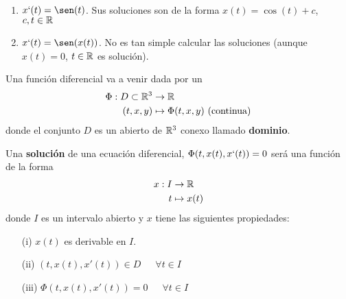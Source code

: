 \begin{ejemplo}\
    \begin{enumerate}[label=\alph*)]
        \item $x`(t)=\sen(t)$. Sus soluciones son de la forma $x(t)=\cos(t)+c$, $c,t\in \mathbb{R}$
        \item $x`(t)=\sen(x(t))$. No es tan simple calcular las soluciones (aunque $x(t)=0$, $t\in \mathbb{R}$ es solución).
    \end{enumerate}
\end{ejemplo}

\begin{definicion}
    Una función diferencial va a venir dada por un 
    \begin{align*}
        \Phi : D \subset \mathbb{R}^3 &\to \mathbb{R}\\
        (t,x,y) &\mapsto \Phi(t,x,y) \text{ (continua)}
    \end{align*}
    donde el conjunto $D$ es un abierto de $\mathbb{R}^3$ conexo llamado \textbf{dominio}.

    Una \textbf{solución} de una ecuación diferencial, $\Phi(t,x(t),x`(t))=0$ será una función de la forma 
    \begin{align*}
        x: I &\to \mathbb{R}\\
        t & \mapsto x(t)
    \end{align*}
    donde $I$ es un intervalo abierto y $x$ tiene las siguientes propiedades:
    \begin{enumerate}
        \item[(i)] $x(t)$ es derivable en $I$.
        \item[(ii)] $(t,x(t), x'(t))\in D$\ \ \ $\forall t \in I$
        \item[(iii)] $\Phi(t, x(t), x'(t))=0$\ \ \ $\forall t \in I$
    \end{enumerate}
\end{definicion}

